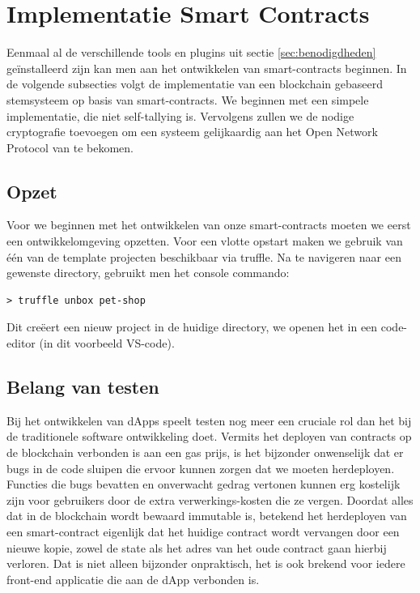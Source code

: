 \section{Implementatie Smart Contracts}

Eenmaal al de verschillende tools en plugins uit sectie \ref{sec:benodigdheden} geïnstalleerd zijn kan men aan het ontwikkelen van smart-contracts beginnen. In de volgende subsecties volgt de implementatie van een blockchain gebaseerd stemsysteem op basis van smart-contracts. We beginnen met een simpele implementatie, die niet self-tallying is. Vervolgens zullen we de nodige cryptografie toevoegen om een systeem gelijkaardig aan het Open Network Protocol van  \textcite{McCorry2017} te bekomen.

\subsection{Opzet}
Voor we beginnen met het ontwikkelen van onze smart-contracts moeten we eerst een ontwikkelomgeving opzetten. Voor een vlotte opstart maken we gebruik van één van de template projecten beschikbaar via truffle. Na te navigeren naar een gewenste directory, gebruikt men het console commando: 
 \lstset{language=bash}
\begin{lstlisting}[numbers=none]
> truffle unbox pet-shop
\end{lstlisting}

Dit creëert een nieuw project in de huidige directory, we openen het in een code-editor (in dit voorbeeld VS-code).

\subsection{Belang van testen}
Bij het ontwikkelen van dApps speelt testen nog  meer een cruciale rol  dan het bij de traditionele software ontwikkeling doet. Vermits het deployen van contracts op de blockchain verbonden is aan een gas prijs, is het bijzonder onwenselijk dat er bugs in de code sluipen die ervoor kunnen zorgen dat we moeten herdeployen. Functies die bugs bevatten en onverwacht gedrag vertonen kunnen erg kostelijk zijn voor gebruikers door de extra verwerkings-kosten die ze vergen. Doordat alles dat in de blockchain wordt bewaard immutable is, betekend het herdeployen van een smart-contract eigenlijk dat het huidige contract wordt vervangen door een nieuwe kopie, zowel de state als het adres van het oude contract gaan hierbij verloren. Dat is niet alleen bijzonder onpraktisch, het is ook brekend voor iedere front-end applicatie die aan de dApp verbonden is. 

